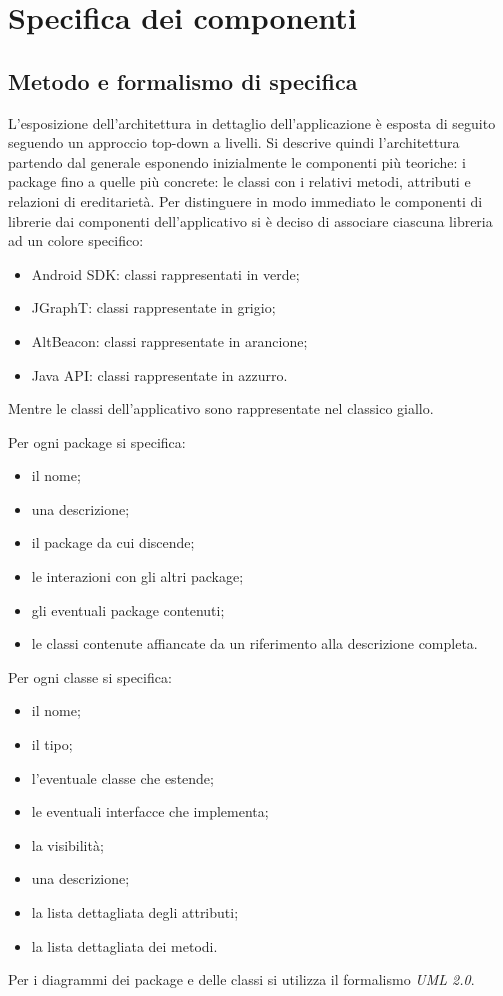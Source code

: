 \documentclass[../DefinizioneDiProdotto.tex]{subfiles}
\begin{document}
\makeatletter
\def\maxwidth{%
	\ifdim\Gin@nat@width>\linewidth
	\linewidth
	\else
	\Gin@nat@width
	\fi
}
\makeatother	

\section{Specifica dei componenti}

	\subsection{Metodo e formalismo di specifica}

		L'esposizione dell'architettura in dettaglio dell'applicazione è esposta di seguito seguendo un approccio top-down a livelli. Si descrive quindi l'architettura partendo dal generale esponendo inizialmente le componenti più teoriche: i package fino a quelle più concrete: le classi con i relativi metodi, attributi e relazioni di ereditarietà. 
		Per distinguere in modo immediato le componenti di librerie dai componenti dell'applicativo si è deciso di associare ciascuna libreria ad un colore specifico:
		\begin{itemize}
			\item Android SDK: classi rappresentati in verde;
			\item JGraphT: classi rappresentate in grigio;
			\item AltBeacon: classi rappresentate in arancione;
			\item Java API: classi rappresentate in azzurro.
		\end{itemize}
		Mentre le classi dell'applicativo sono rappresentate nel classico giallo.
		
		Per ogni package si specifica:
			\begin{itemize}
				\item il nome;
				\item una descrizione;
				\item il package da cui discende;
				\item le interazioni con gli altri package;
				\item gli eventuali package contenuti;
				\item le classi contenute affiancate da un riferimento alla descrizione completa.
			\end{itemize}
		Per ogni classe si specifica:
			\begin{itemize}
				\item il nome;
				\item il tipo;
				\item l'eventuale classe che estende;
				\item le eventuali interfacce che implementa;
				\item la visibilità;
				\item una descrizione;
				\item la lista dettagliata degli attributi;
				\item la lista dettagliata dei metodi.
			\end{itemize}
		Per i diagrammi dei package e delle classi si utilizza il formalismo \textit{UML 2.0}.
		
\end{document}
